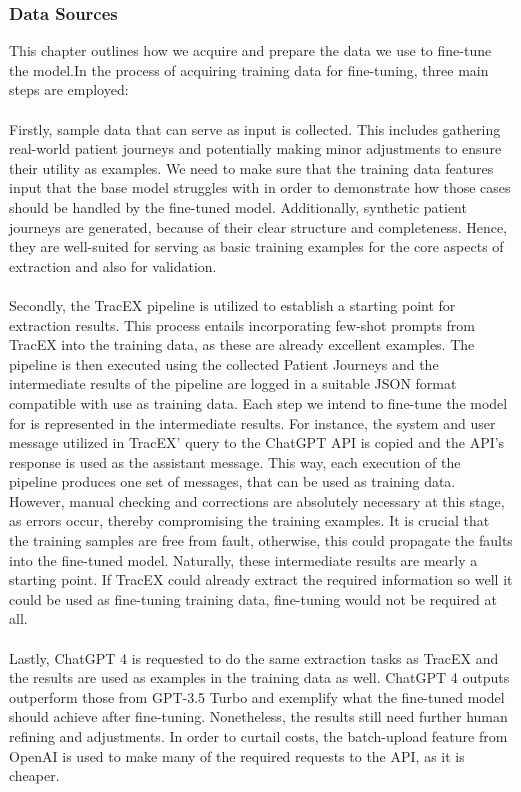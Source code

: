 \subsubsection{Data Sources}\label{sec:data_sources}
This chapter outlines how we acquire and prepare the data we use to fine-tune the model.In the process of acquiring training data for fine-tuning, three main steps are employed:\\\\
Firstly, sample data that can serve as input is collected. This includes gathering real-world patient journeys and potentially making minor adjustments to ensure their utility as examples. We need to make sure that the training data features input that the base model struggles with in order to demonstrate how those cases should be handled by the fine-tuned model. Additionally, synthetic patient journeys are generated, because of their clear structure and completeness. Hence, they are well-suited for serving as basic training examples for the core aspects of extraction and also for validation.\\\\
Secondly, the TracEX pipeline is utilized to establish a starting point for extraction results. This process entails incorporating few-shot prompts from TracEX into the training data, as these are already excellent examples. The pipeline is then executed using the collected Patient Journeys and the intermediate results of the pipeline are logged in a suitable JSON format compatible with use as training data. Each step we intend to fine-tune the model for is represented in the intermediate results. For instance, the system and user message utilized in TracEX' query to the ChatGPT API is copied and the API's response is used as the assistant message. This way, each execution of the pipeline produces one set of messages, that can be used as training data. However, manual checking and corrections are absolutely necessary at this stage, as errors occur, thereby compromising the training examples. It is crucial that the training samples are free from fault, otherwise, this could propagate the faults into the fine-tuned model. Naturally, these intermediate results are mearly a starting point. If TracEX could already extract the required information so well it could be used as fine-tuning training data, fine-tuning would not be required at all.\\\\
Lastly, ChatGPT 4 is requested to do the same extraction tasks as TracEX and the results are used as examples in the training data as well. ChatGPT 4 outputs outperform those from GPT-3.5 Turbo and exemplify what the fine-tuned model should achieve after fine-tuning. Nonetheless, the results still need further human refining and adjustments. In order to curtail costs, the batch-upload feature from OpenAI is used to make many of the required requests to the API, as it is cheaper.

